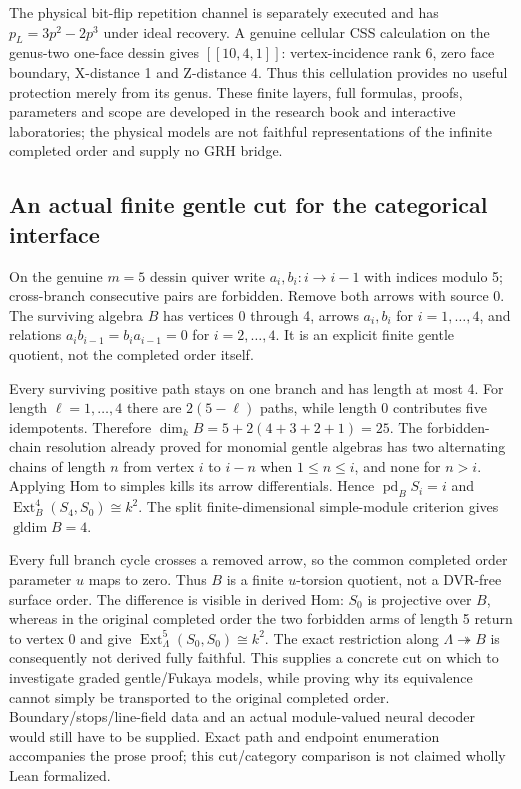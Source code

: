 \documentclass[11pt]{article}
\theoremstyle{definition}\newtheorem{definition}[theorem]{Definition}
\theoremstyle{remark}\newtheorem{remark}[theorem]{Remark}
\begin{document}
The physical bit-flip repetition channel is separately executed and has
$ p_L=3 p^2-2 p^3$ under ideal recovery. A genuine cellular CSS calculation on
the genus-two one-face dessin gives $[[10,4,1]]$: vertex-incidence rank 6,
zero face boundary, X-distance 1 and Z-distance 4. Thus this cellulation
provides no useful protection merely from its genus. These finite layers,
full formulas, proofs, parameters and scope are developed in the research
book and interactive laboratories; the physical models are not faithful
representations of the infinite completed order and supply no GRH bridge.

\subsection{An actual finite gentle cut for the categorical interface}
\label{rg:cut}
On the genuine $ m=5$ dessin quiver write
$ a_i,b_i:i\to i-1$ with indices modulo 5; cross-branch consecutive pairs
are forbidden. Remove both arrows with source 0. The surviving algebra $ B $
has vertices 0 through 4, arrows $ a_i,b_i $ for $ i=1,\ldots,4$, and relations
$ a_i b_{i-1}=b_i a_{i-1}=0$ for $ i=2,\ldots,4$. It is an explicit finite
gentle quotient, not the completed order itself.

Every surviving positive path stays on one branch and has length at most 4.
For length $\ell=1,\ldots,4$ there are $2(5-\ell)$ paths, while length 0
contributes five idempotents. Therefore $\dim_kB=5+2(4+3+2+1)=25$.
The forbidden-chain resolution already proved for monomial gentle algebras
has two alternating chains of length $ n $ from vertex $ i $ to $ i-n $ when
$1\le n\le i $, and none for $ n>i $. Applying Hom to simples kills its
arrow differentials. Hence $\operatorname{pd}_B S_i=i $ and
$\operatorname{Ext}^4_B(S_4,S_0)\cong k^2$. The split finite-dimensional
simple-module criterion gives $\operatorname{gldim}B=4$.

Every full branch cycle crosses a removed arrow, so the common completed
order parameter $ u $ maps to zero. Thus $ B $ is a finite $ u $-torsion quotient,
not a DVR-free surface order. The difference is visible in derived Hom:
$ S_0$ is projective over $ B $, whereas in the original completed order the
two forbidden arms of length 5 return to vertex 0 and give
$\operatorname{Ext}^5_\Lambda(S_0,S_0)\cong k^2$. The exact restriction along
$\Lambda\twoheadrightarrow B $ is consequently not derived fully faithful.
This supplies a concrete cut on which to investigate graded gentle/Fukaya
models, while proving why its equivalence cannot simply be transported to
the original completed order. Boundary/stops/line-field data and an actual
module-valued neural decoder would still have to be supplied. Exact path
and endpoint enumeration accompanies the prose proof; this cut/category
comparison is not claimed wholly Lean formalized.
\end{document}
